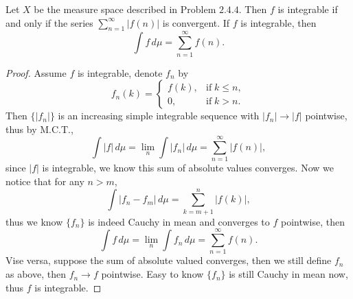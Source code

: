 \begin{pro}%
	Let $X$ be the measure space described in Problem $2.4.4$. Then $f$ is integrable if and only if the series $\sum_{n=1}^\infty |f(n)|$ is convergent. If $f$ is integrable, then
	\[\int f\,d\mu=\sum_{n=1}^\infty f(n).\]
\end{pro}
\begin{proof}
	Assume $f$ is integrable, denote $f_n$ by
	\[f_n(k)=\begin{cases}
	f(k),&\mbox{if}\;k\leq n,\\
	0,&\mbox{if}\;k>n.\end{cases}
	\]
	Then $\{|f_n|\}$ is an increasing simple integrable sequence with $|f_n|\to|f|$ pointwise, thus by M.C.T., 
	\[\int |f|\,d\mu=\lim_n\int |f_n|\,d\mu=\sum_{n=1}^\infty |f(n)|,\]
	since $|f|$ is integrable, we know this sum of absolute values converges. Now we notice that for any $n>m$,
	\[\int |f_n-f_m|\,d\mu=\sum_{k=m+1}^n |f(k)|,\]
	thus we know $\{f_n\}$ is indeed Cauchy in mean and converges to $f$ pointwise, then
	\[\int f\,d\mu=\lim_n \int f_n\,d\mu=\sum_{n=1}^\infty f(n).\]
	Vise versa, suppose the sum of absolute valued converges, then we still define $f_n$ as above, then $f_n\to f$ pointwise. Easy to know $\{f_n\}$ is still Cauchy in mean now, thus $f$ is integrable.
\end{proof}

